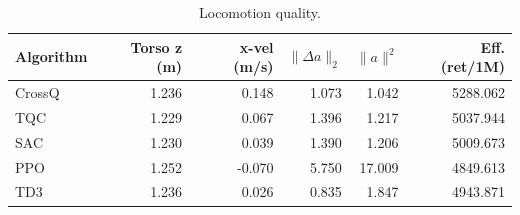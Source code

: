 \begin{table}
\caption{Locomotion quality.}
\label{tab:humanoid_locomotion}
\begin{tabular}{lrrrrr}
\toprule
Algorithm & Torso z (m) & x-vel (m/s) & $\|\Delta a\|_2$ & $\|a\|^2$ & Eff. (ret/1M) \\
\midrule
CrossQ & 1.236 & 0.148 & 1.073 & 1.042 & 5288.062 \\
TQC & 1.229 & 0.067 & 1.396 & 1.217 & 5037.944 \\
SAC & 1.230 & 0.039 & 1.390 & 1.206 & 5009.673 \\
PPO & 1.252 & -0.070 & 5.750 & 17.009 & 4849.613 \\
TD3 & 1.236 & 0.026 & 0.835 & 1.847 & 4943.871 \\
\bottomrule
\end{tabular}
\end{table}
